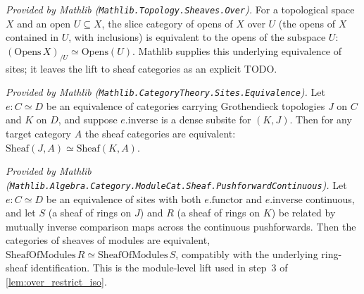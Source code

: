 



\begin{lemma}
  \label{lem:opens_overEquivalence_mathlib}
  \mathlibok
  \textit{Provided by Mathlib (\texttt{Mathlib.Topology.Sheaves.Over}).}
  For a topological space \(X\) and an open \(U \subseteq X\), the slice category of opens of
  \(X\) over \(U\) (the opens of \(X\) contained in \(U\), with inclusions) is equivalent to the
  opens of the subspace \(U\):
  \((\mathrm{Opens}\,X)_{/U} \simeq \mathrm{Opens}(U)\). Mathlib supplies this underlying
  equivalence of sites; it leaves the lift to sheaf categories as an explicit TODO.
\end{lemma}

\begin{lemma}
  \label{lem:equivalence_sheafCongr_mathlib}
  \mathlibok
  \textit{Provided by Mathlib (\texttt{Mathlib.CategoryTheory.Sites.Equivalence}).}
  Let \(e : C \simeq D\) be an equivalence of categories carrying Grothendieck topologies \(J\)
  on \(C\) and \(K\) on \(D\), and suppose \(e.\mathrm{inverse}\) is a dense subsite for
  \((K, J)\). Then for any target category \(A\) the sheaf categories are equivalent:
  \(\mathrm{Sheaf}(J, A) \simeq \mathrm{Sheaf}(K, A)\).
\end{lemma}

\begin{lemma}
  \label{lem:pushforwardPushforwardEquivalence_mathlib}
  \mathlibok
  \textit{Provided by Mathlib
  (\texttt{Mathlib.Algebra.Category.ModuleCat.Sheaf.PushforwardContinuous}).}
  Let \(e : C \simeq D\) be an equivalence of sites with both \(e.\mathrm{functor}\) and
  \(e.\mathrm{inverse}\) continuous, and let \(S\) (a sheaf of rings on \(J\)) and \(R\) (a sheaf
  of rings on \(K\)) be related by mutually inverse comparison maps across the continuous
  pushforwards. Then the categories of sheaves of modules are equivalent,
  \(\mathrm{SheafOfModules}\,R \simeq \mathrm{SheafOfModules}\,S\), compatibly with the
  underlying ring-sheaf identification. This is the module-level lift used in step~3 of
  \cref{lem:over_restrict_iso}.
\end{lemma}

